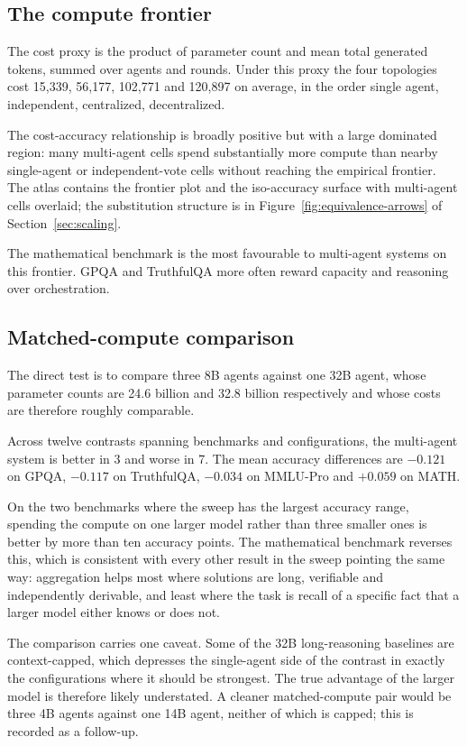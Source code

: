 \subsection{The compute frontier}

The cost proxy is the product of parameter count and mean total generated tokens, summed
over agents and rounds. Under this proxy the four topologies cost 15{,}339, 56{,}177,
102{,}771 and 120{,}897 on average, in the order single agent, independent, centralized,
decentralized.

The cost-accuracy relationship is broadly positive but with a large dominated region: many
multi-agent cells spend substantially more compute than nearby single-agent or
independent-vote cells without reaching the empirical frontier. The atlas contains the
frontier plot and the iso-accuracy surface with multi-agent cells overlaid; the
substitution structure is in Figure~\ref{fig:equivalence-arrows} of
Section~\ref{sec:scaling}.

The mathematical benchmark is the most favourable to multi-agent systems on this frontier.
GPQA and TruthfulQA more often reward capacity and reasoning over orchestration.

\subsection{Matched-compute comparison}

The direct test is to compare three 8B agents against one 32B agent, whose parameter counts
are 24.6 billion and 32.8 billion respectively and whose costs are therefore roughly
comparable.

Across twelve contrasts spanning benchmarks and configurations, the multi-agent system is
better in 3 and worse in 7. The mean accuracy differences are $-0.121$ on GPQA, $-0.117$ on
TruthfulQA, $-0.034$ on MMLU-Pro and $+0.059$ on MATH.

On the two benchmarks where the sweep has the largest accuracy range, spending the compute
on one larger model rather than three smaller ones is better by more than ten accuracy
points. The mathematical benchmark reverses this, which is consistent with every other
result in the sweep pointing the same way: aggregation helps most where solutions are long,
verifiable and independently derivable, and least where the task is recall of a specific
fact that a larger model either knows or does not.

The comparison carries one caveat. Some of the 32B long-reasoning baselines are
context-capped, which depresses the single-agent side of the contrast in exactly the
configurations where it should be strongest. The true advantage of the larger model is
therefore likely understated. A cleaner matched-compute pair would be three 4B agents
against one 14B agent, neither of which is capped; this is recorded as a follow-up.


